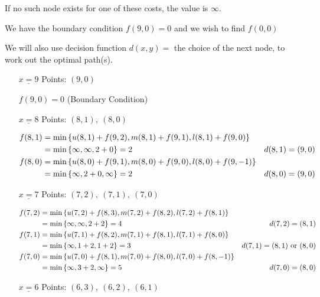 \begin{prob}
\begin{enumerate}[label = {\textbf{(\greek*)}}]
\begin{sol}
        If no such node exists for one of these costs, the value is $\infty$.
        
        We have the boundary condition $f(9,0)=0$ and we wish to find $f(0,0)$
        
        We will also use decision function $d(x,y)=$ the choice of the next node, to work out the optimal path(s).

        
        \begin{itemize}
            \item[$\underline{x=9}$] Points: $(9,0)$
            
            $f(9,0)=0$ (Boundary Condition)
            
            \item[$\underline{x=8}$] Points: $(8,1), \ (8,0)$
            
            $\begin{aligned}
            f(8,1) &= \min\left\{
            u(8,1)+f(9,2),m(8,1)+f(9,1),l(8,1)+f(9,0)\right\}\\
            &= \min\left\{ \infty,\infty,2+0\right\} = 2 & d(8,1)=(9,0)\\
            f(8,0) &= \min\left\{
            u(8,0)+f(9,1),m(8,0)+f(9,0),l(8,0)+f(9,-1)\right\}\\
            &= \min\left\{ \infty,2+0,\infty\right\} = 2 & d(8,0)=(9,0)
            \end{aligned}$
            
            \item[$\underline{x=7}$] Points: $(7,2), \ (7,1), \ (7,0)$
            
            $\begin{aligned}
            f(7,2) &= \min\left\{
            u(7,2)+f(8,3),m(7,2)+f(8,2),l(7,2)+f(8,1)\right\}\\
            &= \min\left\{\infty,\infty,2+2\right\} =4  & d(7,2)=(8,1)\\
            f(7,1) &= \min\left\{
            u(7,1)+f(8,2),m(7,1)+f(8,1),l(7,1)+f(8,0)\right\}\\
            &= \min\left\{\infty,1+2,1+2\right\} =3  & d(7,1)=(8,1) \text{ or } (8,0)\\
            f(7,0) &= \min\left\{
            u(7,0)+f(8,1),m(7,0)+f(8,0),l(7,0)+f(8,-1)\right\}\\
            &= \min\left\{\infty,3+2,\infty\right\} =5  & d(7,0)=(8,0)
            \end{aligned}$
            
            \item[$\underline{x=6}$] Points: $(6,3), \ (6,2), \ (6,1)$
            

\end{itemize}
\end{sol}
\end{enumerate}
\end{prob}
